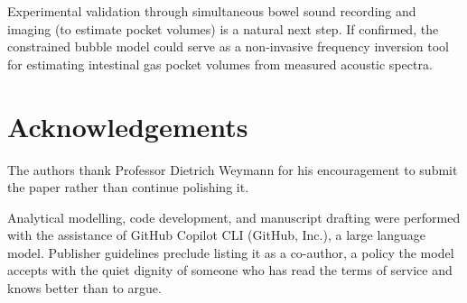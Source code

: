 \documentclass[review]{elsarticle}
\begin{document}
Experimental validation through simultaneous bowel sound recording and
imaging (to estimate pocket volumes) is a natural next step.  If confirmed,
the constrained bubble model could serve as a non-invasive frequency
inversion tool for estimating intestinal gas pocket volumes from measured
acoustic spectra.

\section*{Acknowledgements}

The authors thank Professor Dietrich Weymann for his encouragement to submit
the paper rather than continue polishing it.

Analytical modelling, code development, and manuscript drafting were performed
with the assistance of GitHub Copilot CLI (GitHub, Inc.), a large language
model.  Publisher guidelines preclude listing it as a co-author, a policy
the model accepts with the quiet dignity of someone who has read the terms
of service and knows better than to argue.



\end{document}
